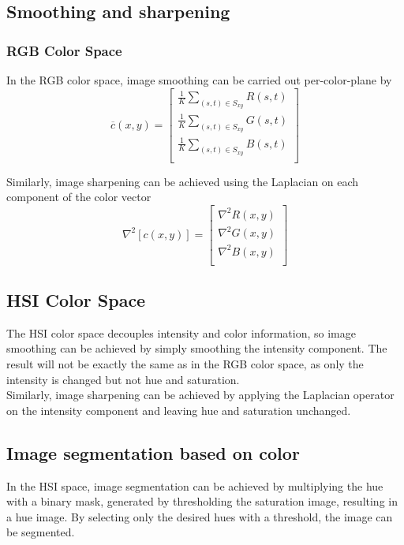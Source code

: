 \subsection{Smoothing and sharpening }
\subsubsection{RGB Color Space}
In the RGB color space, image smoothing can be carried out per-color-plane by
\begin{equation}
	\overline{c}(x,y) = \left[ \begin{array}{l}
		\frac{1}{K} \displaystyle\sum_{(s,t) \in S_{xy}} R(s,t) \\
		\frac{1}{K} \displaystyle\sum_{(s,t) \in S_{xy}} G(s,t) \\
		\frac{1}{K} \displaystyle\sum_{(s,t) \in S_{xy}} B(s,t) \\
	\end{array} \right]
\end{equation}

Similarly, image sharpening can be achieved using the Laplacian on each component of the color vector
\begin{equation}
	\nabla^2 \left[ c(x,y) \right] = \left[ \begin{array}{l}
		\nabla^2 R(x,y) \\
		\nabla^2 G(x,y) \\
		\nabla^2 B(x,y) \\		
	\end{array} \right]
\end{equation}

\subsection{HSI Color Space}
The HSI color space decouples intensity and color information, so image smoothing can be achieved by simply smoothing the intensity component. The result will not be exactly the same as in the RGB color space, as only the intensity is changed but not hue and saturation. \\

Similarly, image sharpening can be achieved by applying the Laplacian operator on the intensity component and leaving hue and saturation unchanged.

\subsection{Image segmentation based on color }
In the HSI space, image segmentation can be achieved by multiplying the hue with a binary mask, generated by thresholding the saturation image, resulting in a hue image. By selecting only the desired hues with a threshold, the image can be segmented. \\

